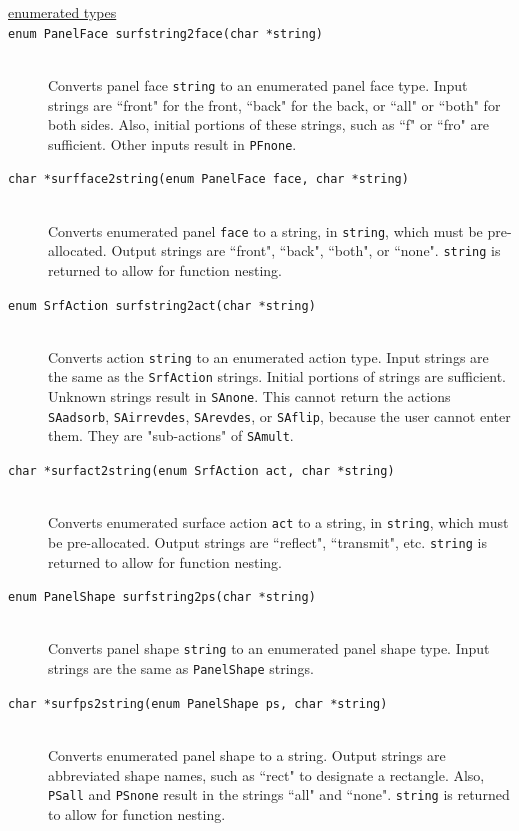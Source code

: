 \documentclass {scrbook}
\newcommand {\ttt} {\texttt}
\begin{document}
\begin{description}

\item[\underline{enumerated types}]

\item[\ttt{enum PanelFace surfstring2face(char *string)}]
\hfill \\
Converts panel face \ttt{string} to an enumerated panel face type. Input strings are ``front" for the front, ``back" for the back, or ``all" or ``both" for both sides. Also, initial portions of these strings, such as ``f" or ``fro" are sufficient. Other inputs result in \ttt{PFnone}.

\item[\ttt{char *surfface2string(enum PanelFace face, char *string)}]
\hfill \\
Converts enumerated panel \ttt{face} to a string, in \ttt{string}, which must be pre-allocated. Output strings are ``front", ``back", ``both", or ``none". \ttt{string} is returned to allow for function nesting.

\item[\ttt{enum SrfAction surfstring2act(char *string)}]
\hfill \\
Converts action \ttt{string} to an enumerated action type. Input strings are the same as the \ttt{SrfAction} strings. Initial portions of strings are sufficient. Unknown strings result in \ttt{SAnone}. This cannot return the actions \ttt{SAadsorb}, \ttt{SAirrevdes}, \ttt{SArevdes}, or \ttt{SAflip}, because the user cannot enter them. They are "sub-actions" of \ttt{SAmult}.

\item[\ttt{char *surfact2string(enum SrfAction act, char *string)}]
\hfill \\
Converts enumerated surface action \ttt{act} to a string, in \ttt{string}, which must be pre-allocated. Output strings are ``reflect", ``transmit", etc. \ttt{string} is returned to allow for function nesting.

\item[\ttt{enum PanelShape surfstring2ps(char *string)}]
\hfill \\
Converts panel shape \ttt{string} to an enumerated panel shape type. Input strings are the same as \ttt{PanelShape} strings.

\item[\ttt{char *surfps2string(enum PanelShape ps, char *string)}]
\hfill \\
Converts enumerated panel shape to a string. Output strings are abbreviated shape names, such as ``rect" to designate a rectangle. Also, \ttt{PSall} and \ttt{PSnone} result in the strings ``all" and ``none". \ttt{string} is returned to allow for function nesting.


\end{description}
\end{document}
